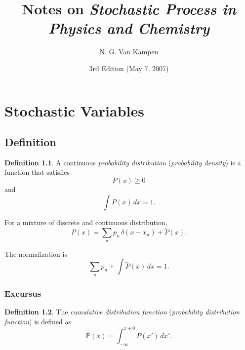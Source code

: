 \documentclass{book}
\theoremstyle{plain}
\theoremstyle{definition}
\newtheorem{defn}{Definition}[section]
\theoremstyle{remark}
\begin{document}
\newcommand{\repl}[2]{{\color{gray} [#1] }{\color{blue} #2}}
\newcommand{\add}[1]{{\color{blue} #1}}
\newcommand{\del}[1]{{\color{gray} [#1]}}
\newcommand{\note}[1]{{\color{OliveGreen}\small [\textbf{Comment.} #1]}}

\newcommand{\hl}[1]{{\color{red} #1}}

\title{Notes on \emph{Stochastic Process in Physics and Chemistry}\cite{vankampen}}
\author{N. G. Van Kampen}
\date{3rd Edition (May 7, 2007)}

\maketitle

\tableofcontents


\chapter{Stochastic Variables}

\section{Definition}

\begin{defn}
  A continuous \emph{probability distribution}
  (\emph{probability density}) is a function
  that satisfies
  \begin{equation}
    P(x) \ge 0
    \label{eq:Px_nonneg}
  \end{equation}
  and
  \begin{equation}
    \int P(x) \, dx = 1.
    \label{eq:Px_normalize}
  \end{equation}
\end{defn}

For a mixture of discrete and continuous distribution,
\begin{equation}
  P(x) = \sum_n p_n \, \delta(x - x_n) + \tilde P(x).
  \label{eq:Px_mixture}
\end{equation}

The normalization is
$$
\sum_{n} p_n + \int \tilde P(x) \, dx = 1.
$$

\subsection*{Excursus}

\begin{defn}
  The \emph{cumulative distribution function}
  (\emph{probability distribution function})
  is defined as
  \begin{equation}
    \mathbb{P}(x) = \int_{-\infty}^{x+0} P(x') \, dx'.
  \end{equation}
\end{defn}
\end{document}
